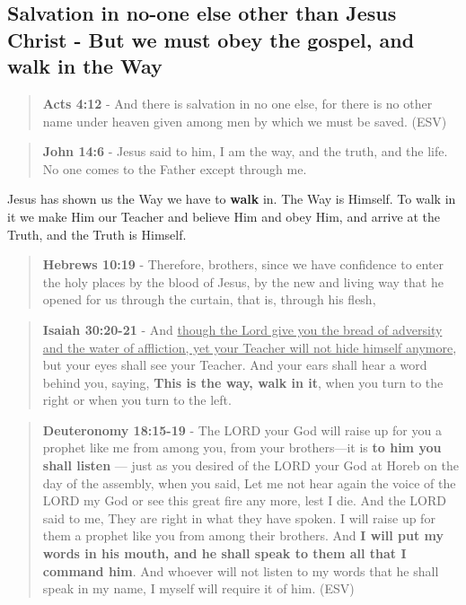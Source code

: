 \documentclass[11pt]{article}
\begin{document}
\subsection{Salvation in no-one else other than Jesus Christ - But we must obey the gospel, and walk in the Way}
\label{sec:org8b6a9eb}
\begin{quote}
\textbf{Acts 4:12} - And there is salvation in no one else, for there is no other name under heaven given among men by which we must be saved. (ESV)
\end{quote}

\begin{quote}
\textbf{John 14:6} - Jesus said to him, I am the way, and the truth, and the life. No one comes to the Father except through me.
\end{quote}

Jesus has shown us the Way we have to \textbf{walk} in. The Way is Himself. To walk in it we make Him our Teacher and believe Him and obey Him, and arrive at the Truth, and the Truth is Himself.

\begin{quote}
\textbf{Hebrews 10:19} - Therefore, brothers, since we have confidence to enter the holy places by the blood of Jesus, by the new and living way that he opened for us through the curtain, that is, through his flesh,
\end{quote}

\begin{quote}
\textbf{Isaiah 30:20-21} - And \uline{though the Lord give you the bread of adversity and the water of affliction, yet your Teacher will not hide himself anymore}, but your eyes shall see your Teacher. And your ears shall hear a word behind you, saying, \textbf{This is the way, walk in it}, when you turn to the right or when you turn to the left.
\end{quote}

\begin{quote}
\textbf{Deuteronomy 18:15-19} - The LORD your God will raise up for you a prophet like me from among you, from your brothers—it is \textbf{to him you shall listen} — just as you desired of the LORD your God at Horeb on the day of the assembly, when you said, Let me not hear again the voice of the LORD my God or see this great fire any more, lest I die. And the LORD said to me, They are right in what they have spoken. I will raise up for them a prophet like you from among their brothers. And \textbf{I will put my words in his mouth, and he shall speak to them all that I command him}. And whoever will not listen to my words that he shall speak in my name, I myself will require it of him. (ESV)
\end{quote}
\end{document}
